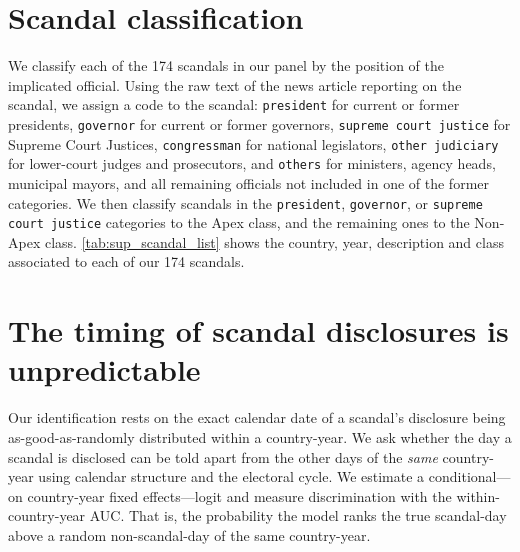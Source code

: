 \documentclass[11pt]{article}
\begin{document}
\clearpage
\section{Scandal classification}\label{sup:classification}

We classify each of the 174 scandals in our panel by the position of the implicated official. Using the raw text of the news article reporting on the scandal, we assign a code to the scandal: \texttt{president} for current or former presidents, \texttt{governor} for current or former governors, \texttt{supreme court justice} for Supreme Court Justices, \texttt{congressman} for national legislators, \texttt{other judiciary} for lower-court judges and prosecutors, and \texttt{others} for ministers, agency heads, municipal mayors, and all remaining officials not included in one of the former categories. We then classify scandals in the \texttt{president}, \texttt{governor}, or \texttt{supreme court justice} categories to the Apex class, and the remaining ones to the Non-Apex class. \autoref{tab:sup_scandal_list} shows the country, year, description and class associated to each of our 174 scandals. 



\clearpage
\section{The timing of scandal disclosures is unpredictable}\label{sup:random}

Our identification rests on the exact calendar date of a scandal's disclosure being as-good-as-randomly distributed within a country-year. We ask whether the day a scandal is disclosed can be told apart from the other days of the \emph{same} country-year using calendar structure and the electoral cycle. We estimate a conditional---on country-year fixed effects---logit and measure discrimination with the within-country-year AUC. That is, the probability the model ranks the true scandal-day above a random non-scandal-day of the same country-year.
\end{document}
